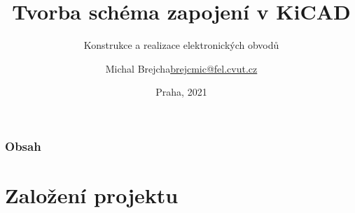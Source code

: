 \documentclass{beamer}
\title[KiCAD Eeschema]{Tvorba schéma zapojení v KiCAD}
\subtitle[KEO] {Konstrukce a realizace elektronických obvodů}
\author[Brejcha]{\texorpdfstring{Michal Brejcha\newline\url{brejcmic@fel.cvut.cz}}{Michal Brejcha}}
\institute[ČVUT]{ČVUT v Praze, FEL}
\date[Praha, 2021]{Praha, 2021}
\begin{document}
\frame{\titlepage}

\begin{frame}
\frametitle{Obsah} 
\tableofcontents
\end{frame}


\section{\texorpdfstring{Založení projektu}{Zalozeni projektu}}
\end{document}
